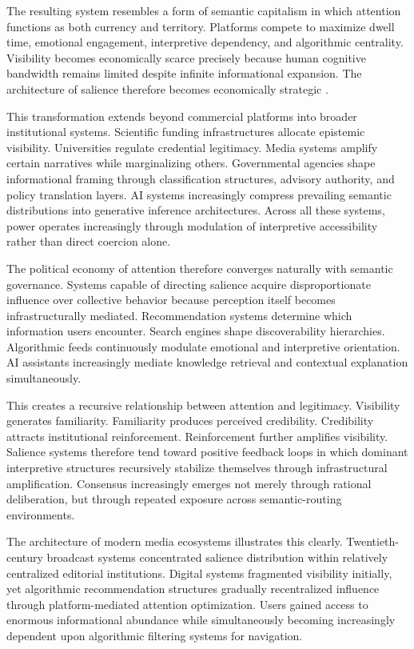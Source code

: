 \documentclass[11pt,a4paper]{article}
\begin{document}
The resulting system resembles a form of semantic capitalism in which attention functions as both currency and territory. Platforms compete to maximize dwell time, emotional engagement, interpretive dependency, and algorithmic centrality. Visibility becomes economically scarce precisely because human cognitive bandwidth remains limited despite infinite informational expansion. The architecture of salience therefore becomes economically strategic \cite{gillespie2018}.

This transformation extends beyond commercial platforms into broader institutional systems. Scientific funding infrastructures allocate epistemic visibility. Universities regulate credential legitimacy. Media systems amplify certain narratives while marginalizing others. Governmental agencies shape informational framing through classification structures, advisory authority, and policy translation layers. AI systems increasingly compress prevailing semantic distributions into generative inference architectures. Across all these systems, power operates increasingly through modulation of interpretive accessibility rather than direct coercion alone.

The political economy of attention therefore converges naturally with semantic governance. Systems capable of directing salience acquire disproportionate influence over collective behavior because perception itself becomes infrastructurally mediated. Recommendation systems determine which information users encounter. Search engines shape discoverability hierarchies. Algorithmic feeds continuously modulate emotional and interpretive orientation. AI assistants increasingly mediate knowledge retrieval and contextual explanation simultaneously.

This creates a recursive relationship between attention and legitimacy. Visibility generates familiarity. Familiarity produces perceived credibility. Credibility attracts institutional reinforcement. Reinforcement further amplifies visibility. Salience systems therefore tend toward positive feedback loops in which dominant interpretive structures recursively stabilize themselves through infrastructural amplification. Consensus increasingly emerges not merely through rational deliberation, but through repeated exposure across semantic-routing environments.

The architecture of modern media ecosystems illustrates this clearly. Twentieth-century broadcast systems concentrated salience distribution within relatively centralized editorial institutions. Digital systems fragmented visibility initially, yet algorithmic recommendation structures gradually recentralized influence through platform-mediated attention optimization. Users gained access to enormous informational abundance while simultaneously becoming increasingly dependent upon algorithmic filtering systems for navigation.
\end{document}
